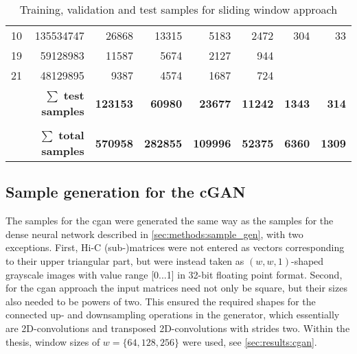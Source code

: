 \begin{table}[hbp]
\begin{tabular}{lrrrrrrr}
10                                                       & 135534747                                               & 26868                  & 13315                   & 5183                    & 2472                    & 304                      & 33                       \\
19                                                       & 59128983                                                & 11587                  & 5674                    & 2127                    & 944                     &                          &                          \\
21                                                       & 48129895                                                & 9387                   & 4574                    & 1687                    & 724                     &                          &                          \\
\multicolumn{2}{r}{$\mathbf{\sum}$ \textbf{test samples}}                                                                          & \textbf{123153}        & \textbf{60980}          & \textbf{23677}          & \textbf{11242}          & \textbf{1343}            & \textbf{314}             \\
                                                         &                                                         & \multicolumn{1}{l}{}   & \multicolumn{1}{l}{}    & \multicolumn{1}{l}{}    & \multicolumn{1}{l}{}    & \multicolumn{1}{l}{}     & \multicolumn{1}{l}{}     \\
\multicolumn{2}{r}{$\mathbf{\sum}$ \textbf{total samples}}                                                                         & \textbf{570958}        & \textbf{282855}         & \textbf{109996}         & \textbf{52375}          & \textbf{6360}            & \textbf{1309}            \\ \hline
\end{tabular}
\caption{Training, validation and test samples for sliding window approach} \label{tab:methods:samples}
\end{table}

\subsection{Sample generation for the cGAN} \label{sec:methods:sample_gen_cgan}
The samples for the \acrshort{cgan} were generated the same way as the samples for the dense neural network described 
in \cref{sec:methods:sample_gen}, with two exceptions.
First, Hi-C (sub-)matrices were not entered as vectors corresponding to their upper triangular part, 
but were instead taken as $(w, w, 1)$-shaped grayscale images with value range [0...1] in 32-bit floating point format.
Second, for the \acrshort{cgan} approach the input matrices need not only be square,
but their sizes also needed to be powers of two. 
This ensured the required shapes for the connected up- and downsampling operations in the generator, 
which essentially are 2D-convolutions and transposed 2D-convolutions with strides two.
Within the thesis, window sizes of $w=\{64,128,256\}$ were used, see \cref{sec:results:cgan}.

